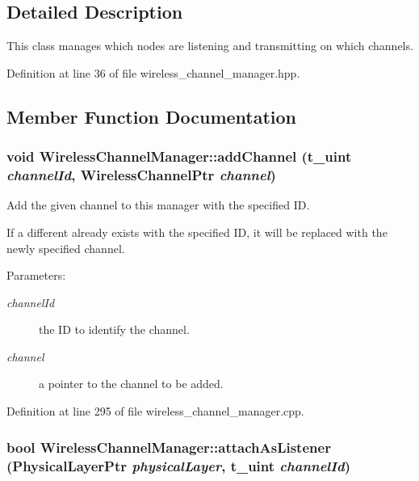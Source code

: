 \subsection{Detailed Description}
This class manages which nodes are listening and transmitting on which channels. 



Definition at line 36 of file wireless\_\-channel\_\-manager.hpp.

\subsection{Member Function Documentation}
\subsubsection{\setlength{\rightskip}{0pt plus 5cm}void Wireless\-Channel\-Manager::add\-Channel (\bf{t\_\-uint} {\em channel\-Id}, Wireless\-Channel\-Ptr {\em channel})}\label{classWirelessChannelManager_b6f5b1981bde593e91469ad995a03a6a}


Add the given channel to this manager with the specified ID. 

If a different already exists with the specified ID, it will be replaced with the newly specified channel. \begin{Desc}
\item[Parameters:]
\begin{description}
\item[{\em channel\-Id}]the ID to identify the channel. \item[{\em channel}]a pointer to the channel to be added. \end{description}
\end{Desc}


Definition at line 295 of file wireless\_\-channel\_\-manager.cpp.
\subsubsection{\setlength{\rightskip}{0pt plus 5cm}bool Wireless\-Channel\-Manager::attach\-As\-Listener (Physical\-Layer\-Ptr {\em physical\-Layer}, \bf{t\_\-uint} {\em channel\-Id})}\label{classWirelessChannelManager_1f0dcd565143650f59ae492f58f8dc83}


